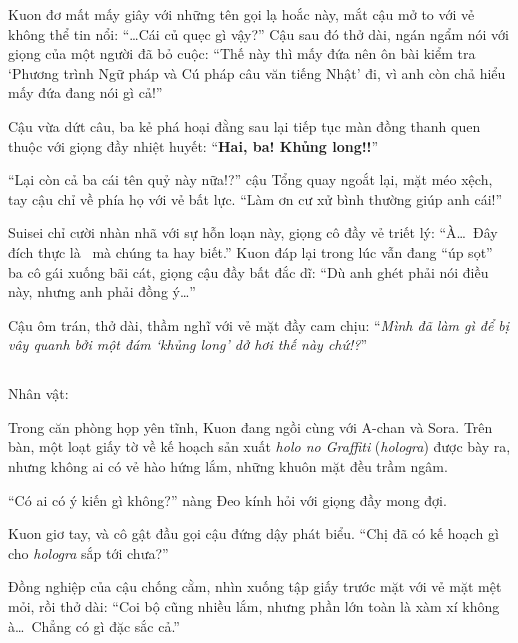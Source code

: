 \documentclass[../main.tex]{subfiles}
\begin{document}
Kuon đơ mất mấy giây với những tên gọi lạ hoắc này, mắt cậu mở to với vẻ không thể tin nổi: ``\dots Cái củ quẹc gì vậy?'' Cậu sau đó thở dài, ngán ngẩm nói với giọng của một người đã bỏ cuộc: ``Thế này thì mấy đứa nên ôn bài kiểm tra `Phương trình Ngữ pháp và Cú pháp câu văn tiếng Nhật' đi, vì anh còn chả hiểu mấy đứa đang nói gì cả!''

Cậu vừa dứt câu, ba kẻ phá hoại đằng sau lại tiếp tục màn đồng thanh quen thuộc với giọng đầy nhiệt huyết: ``\textbf{Hai, ba! Khủng long!!}''

``Lại còn cả ba cái tên quỷ này nữa!?'' cậu Tổng quay ngoắt lại, mặt méo xệch, tay cậu chỉ về phía họ với vẻ bất lực. ``Làm ơn cư xử bình thường giúp anh cái!''


Suisei chỉ cười nhàn nhã với sự hỗn loạn này, giọng cô đầy vẻ triết lý: ``À\dots\ Đây đích thực là \hll\ mà chúng ta hay biết.'' Kuon đáp lại trong lúc vẫn đang ``úp sọt'' ba cô gái xuống bãi cát, giọng cậu đầy bất đắc dĩ: ``Dù anh ghét phải nói điều này, nhưng anh phải đồng ý\dots''

Cậu ôm trán, thở dài, thầm nghĩ với vẻ mặt đầy cam chịu: ``\textit{Mình đã làm gì để bị vây quanh bởi một đám `khủng long' dở hơi thế này chứ!?}''

\newpage

\subsection*{\label{ep-S13.IX}}
\begin{center}
  {\caviar\fontsize{12pt}{12pt}\selectfont Nhân vật:   }
\end{center}

Trong căn phòng họp yên tĩnh, Kuon đang ngồi cùng với A-chan và Sora. Trên bàn, một loạt giấy tờ về kế hoạch sản xuất \textit{holo no Graffiti} (\textit{hologra}) được bày ra, nhưng không ai có vẻ hào hứng lắm, những khuôn mặt đều trầm ngâm.

``Có ai có ý kiến gì không?'' nàng Đeo kính hỏi với giọng đầy mong đợi.

Kuon giơ tay, và cô gật đầu gọi cậu đứng dậy phát biểu. ``Chị đã có kế hoạch gì cho \textit{hologra} sắp tới chưa?''

Đồng nghiệp của cậu chống cằm, nhìn xuống tập giấy trước mặt với vẻ mặt mệt mỏi, rồi thở dài: ``Coi bộ cũng nhiều lắm, nhưng phần lớn toàn là xàm xí không à\dots\ Chẳng có gì đặc sắc cả.''
\end{document}
